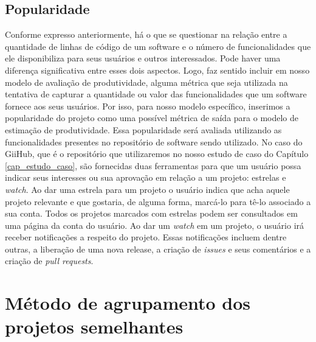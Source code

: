 \subsection{Popularidade}


Conforme expresso anteriormente, há o que se questionar na relação entre a quantidade de linhas de código de um software e o número de funcionalidades que ele disponibiliza para seus usuários e outros interessados. Pode haver uma diferença significativa entre esses dois aspectos. Logo, faz sentido incluir em nosso modelo de avaliação de produtividade, alguma métrica que seja utilizada na tentativa de capturar a quantidade ou valor das funcionalidades que um software fornece aos seus usuários. Por isso, para nosso modelo específico, inserimos a popularidade do projeto como uma possível métrica de saída para o modelo de estimação de produtividade. Essa popularidade será avaliada utilizando as funcionalidades presentes no repositório de software sendo utilizado. No caso do GiiHub, que é o repositório que utilizaremos no nosso estudo de caso do Capítulo \ref{cap_estudo_caso}, são fornecidas duas ferramentas para que um usuário possa indicar seus interesses ou sua aprovação em relação a um projeto: estrelas e \textit{watch}. Ao dar uma estrela para um projeto o usuário indica que acha aquele projeto  relevante e que gostaria, de alguma forma, marcá-lo para tê-lo associado a sua conta. Todos os projetos marcados com estrelas podem ser consultados em uma página da conta do usuário.  Ao dar um \textit{watch} em um projeto, o usuário irá receber notificações a respeito do projeto. Essas notificações incluem dentre outras, a liberação de uma nova release, a criação de \textit{issues} e seus comentários e a criação de \textit{pull requests}.


\section{Método de agrupamento dos projetos semelhantes}

